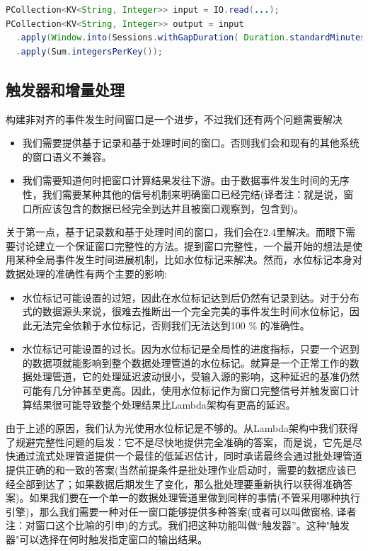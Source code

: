 \documentclass[oneside]{ctexbook}
\begin{document}
\begin{lstlisting}[language=java]
PCollection<KV<String, Integer>> input = IO.read(...);
PCollection<KV<String, Integer>> output = input
  .apply(Window.into(Sessions.withGapDuration( Duration.standardMinutes(30))))
  .apply(Sum.integersPerKey());
\end{lstlisting}

\subsection{触发器和增量处理}

构建非对齐的事件发生时间窗口是一个进步，不过我们还有两个问题需要解决

\begin{itemize}
\item 我们需要提供基于记录和基于处理时间的窗口。否则我们会和现有的其他系统的窗口语义不兼容。
\item 我们需要知道何时把窗口计算结果发往下游。由于数据事件发生时间的无序性，我们需要某种其他的信号机制来明确窗口已经完结(译者注：就是说，窗口所应该包含的数据已经完全到达并且被窗口观察到，包含到)。
\end{itemize}

关于第一点，基于记录数和基于处理时间的窗口，我们会在2.4里解决。而眼下需要讨论建立一个保证窗口完整性的方法。提到窗口完整性，一个最开始的想法是使用某种全局事件发生时间进展机制，比如水位标记来解决。然而，水位标记本身对数据处理的准确性有两个主要的影响:

\begin{itemize}
\item 水位标记可能设置的过短，因此在水位标记达到后仍然有记录到达。对于分布式的数据源头来说，很难去推断出一个完全完美的事件发生时间水位标记，因此无法完全依赖于水位标记，否则我们无法达到100 \% 的准确性。
\item 水位标记可能设置的过长。因为水位标记是全局性的进度指标，只要一个迟到的数据项就能影响到整个数据处理管道的水位标记。就算是一个正常工作的数据处理管道，它的处理延迟波动很小，受输入源的影响，这种延迟的基准仍然可能有几分钟甚至更高。因此，使用水位标记作为窗口完整信号并触发窗口计算结果很可能导致整个处理结果比Lambda架构有更高的延迟。
\end{itemize}

由于上述的原因，我们认为光使用水位标记是不够的。从Lambda架构中我们获得了规避完整性问题的启发：它不是尽快地提供完全准确的答案，而是说，它先是尽快通过流式处理管道提供一个最佳的低延迟估计，同时承诺最终会通过批处理管道提供正确的和一致的答案(当然前提条件是批处理作业启动时，需要的数据应该已经全部到达了；如果数据后期发生了变化，那么批处理要重新执行以获得准确答案)。如果我们要在一个单一的数据处理管道里做到同样的事情(不管采用哪种执行引擎)，那么我们需要一种对任一窗口能够提供多种答案(或者可以叫做窗格, 译者注：对窗口这个比喻的引申)的方式。我们把这种功能叫做“触发器”。这种"触发器"可以选择在何时触发指定窗口的输出结果。
\end{document}
